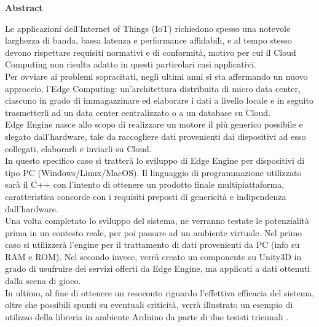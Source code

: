 \null{}
\begin{center}
	\huge{\textbf{Abstract}}
\end{center}
Le applicazioni dell'Internet of Things (IoT) richiedono spesso una notevole larghezza di banda, bassa latenza e performance affidabili, e al tempo stesso devono rispettare requisiti normativi e di conformità, motivo per cui il Cloud Computing non risulta adatto in questi particolari casi applicativi.\\
Per ovviare ai problemi sopracitati, negli ultimi anni si sta affermando un nuovo approccio, l'Edge Computing: un’architettura distribuita di micro data center, ciascuno in grado di immagazzinare ed elaborare i dati a livello locale e in seguito trasmetterli ad un data center centralizzato o a un database su Cloud.\\
Edge Engine nasce allo scopo di realizzare un motore il più generico possibile e slegato dall'hardware, tale da raccogliere dati provenienti dai dispositivi ad esso collegati, elaborarli e inviarli su Cloud.\\
In questo specifico caso si tratterà lo sviluppo di Edge Engine per dispositivi di tipo PC (Windows/Linux/MacOS). Il linguaggio di programmazione utilizzato sarà il C++ con l'intento di ottenere un prodotto finale multipiattaforma, caratteristica concorde con i requisiti preposti di genericità e indipendenza dall'hardware.\\
Una volta completato lo sviluppo del sistema, ne verranno testate le potenzialità prima in un contesto reale, per poi passare ad un ambiente virtuale. Nel primo caso si utilizzerà l'engine per il trattamento di dati provenienti da PC (info su RAM e ROM). Nel secondo invece, verrà creato un componente su Unity3D in grado di usufruire dei servizi offerti da Edge Engine, ma applicati a dati ottenuti dalla scena di gioco.\\
In ultimo, al fine di ottenere un resoconto riguardo l'effettiva efficacia del sistema, oltre che possibili spunti su eventuali criticità, verrà illustrato un esempio di utilizzo della libreria in ambiente Arduino da parte di due tesisti triennali .
\null{}


